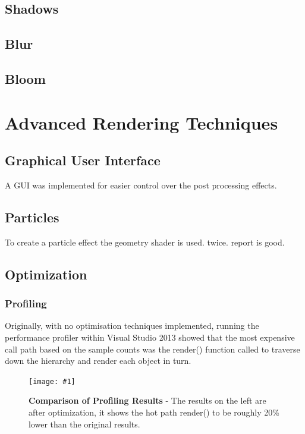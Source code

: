 \documentclass[conference]{acmsiggraph}
\newcommand{\figuremacroW}[4]{
	\begin{figure}[h] %
		\centering
		\texttt{[image: \#1]}
		\caption[#2]{\textbf{#2} - #3}
		\label{fig:#1}
	\end{figure}
}
\begin{document}
\subsection{Shadows}

\subsection{Blur}

\subsection{Bloom}

\section{Advanced Rendering Techniques}

\subsection{Graphical User Interface}

A GUI was implemented for easier control over the post processing effects. 

\subsection{Particles}

To create a particle effect the geometry shader is used. twice. report is good. 


\subsection{Optimization}

\subsubsection{Profiling}
Originally, with no optimisation techniques implemented, running the performance profiler within Visual Studio 2013 showed that the most expensive call path based on the sample counts was the render() function called to traverse down the hierarchy and render each object in turn.

\figuremacroW
{compare}
{Comparison of Profiling Results}
{The results on the left are after optimization, it shows the hot path render() to be roughly 20\% lower than the original results.}
{1.0}
\end{document}
